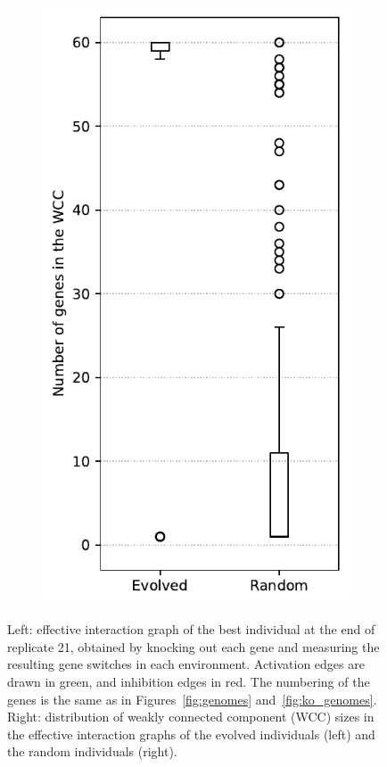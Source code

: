 \begin{figure}[H]
\begin{subfigure}[c]{0.29\textwidth}
    \includegraphics[width=\textwidth]{ploscb/img/effective_graph_wcc_distr.pdf}
  \end{subfigure}
  \caption{Left: effective interaction graph of the best individual at the end of replicate 21, obtained by knocking out each gene and measuring the resulting gene switches in each environment.
  Activation edges are drawn in green, and inhibition edges in red.
  The numbering of the genes is the same as in Figures~\ref{fig:genomes} and~\ref{fig:ko_genomes}.
  Right: distribution of weakly connected component (WCC) sizes in the effective interaction graphs of the evolved individuals (left) and the random individuals (right).}
  \label{fig:ko_graph}
\end{figure}

